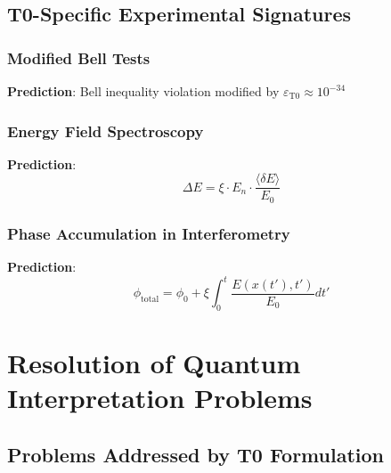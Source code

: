 \documentclass[12pt,a4paper]{article}
\newcommand{\xipar}{\xi}
\begin{document}
	\subsection{T0-Specific Experimental Signatures}
	
	\subsubsection{Modified Bell Tests}
	
	\textbf{Prediction}: Bell inequality violation modified by $\varepsilon_{\mathrm{T0}} \approx 10^{-34}$
	
	\subsubsection{Energy Field Spectroscopy}
	
	\textbf{Prediction}: 
	\begin{equation}
		\Delta E = \xipar \cdot E_n \cdot \frac{\langle \delta E \rangle}{E_0}
	\end{equation}
	
	\subsubsection{Phase Accumulation in Interferometry}
	
	\textbf{Prediction}:
	\begin{equation}
		\phi_{\mathrm{total}} = \phi_0 + \xipar \int_0^t \frac{E(x(t'), t')}{E_0} dt'
	\end{equation}
	
	\section{Resolution of Quantum Interpretation Problems}
	
	\subsection{Problems Addressed by T0 Formulation}
	
\end{document}
